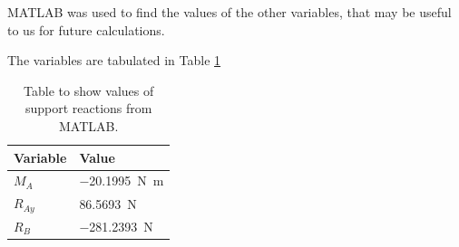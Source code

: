 \documentclass[11pt]{article}
\numberwithin{equation}{section}
\begin{document}
MATLAB was used to find the values of the other variables, that may be useful to us for future calculations.

The variables are tabulated in Table \ref{tab:supportReactions}
\begin{table}[H]
    \centering
    \begin{tabular}{ll}
        \toprule
        Variable & Value\\
        \midrule
        $M_A$ & \SI{-20.1995}{\newton\meter}\\
        $R_{Ay}$ & \SI{86.5693}{\newton}\\
        $R_B$ & \SI{-281.2393}{\newton}\\
        \bottomrule
    \end{tabular}
    \caption{Table to show values of support reactions from MATLAB.}
    \label{tab:supportReactions}
\end{table}
\end{document}
